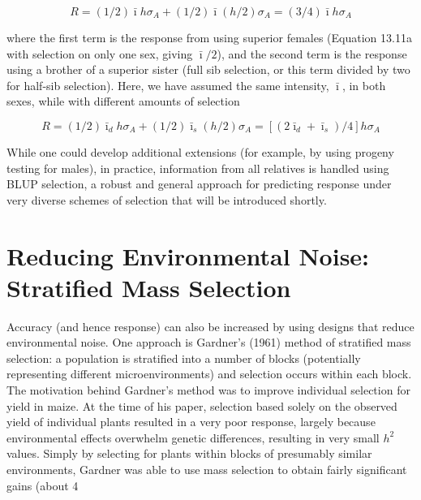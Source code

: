 \documentclass{article}
\begin{document}
\begin{equation}
R=\left(1/2\right)\bar{\imath}h\sigma_{A}+\left(1/2\right)\bar{\imath}\left(h/2\right)\sigma_{A}=\left(3/4\right)\bar{\imath}h\sigma_{A}
\end{equation}

where the first term is the response from using superior females (Equation 13.11a with selection on only one sex, giving  $ \bar{\imath}/2 $), and the second term is the response using a brother of a superior sister (full sib selection, or this term divided by two for half-sib selection). Here, we have assumed the same intensity,  $ \bar{\imath} $, in both sexes, while with different amounts of selection

\begin{equation}
R=\left(1/2\right)\bar{\imath}_{d}h\sigma_{A}+\left(1/2\right)\bar{\imath}_{s}\left(h/2\right)\sigma_{A}=\left[\left(2\bar{\imath}_{d}+\bar{\imath}_{s}\right)/4\right]h\sigma_{A}
\end{equation}

While one could develop additional extensions (for example, by using progeny testing for males), in practice, information from all relatives is handled using BLUP selection, a robust and general approach for predicting response under very diverse schemes of selection that will be introduced shortly.

\section{Reducing Environmental Noise: Stratified Mass Selection}
Accuracy (and hence response) can also be increased by using designs that reduce environmental noise. One approach is Gardner's (1961) method of stratified mass selection: a population is stratified into a number of blocks (potentially representing different microenvironments) and selection occurs within each block. The motivation behind Gardner's method was to improve individual selection for yield in maize. At the time of his paper, selection based solely on the observed yield of individual plants resulted in a very poor response, largely because environmental effects overwhelm genetic differences, resulting in very small  $ h^{2} $ values. Simply by selecting for plants within blocks of presumably similar environments, Gardner was able to use mass selection to obtain fairly significant gains (about 4%
\end{document}

